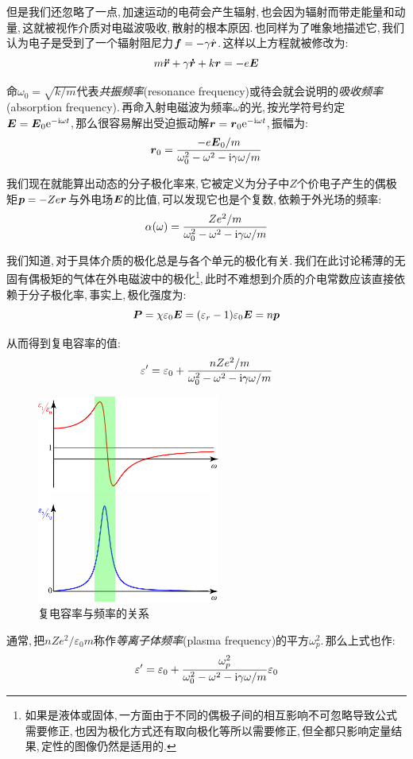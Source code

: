 但是我们还忽略了一点,\,加速运动的电荷会产生辐射,\,也会因为辐射而带走能量和动量,\,这就被视作介质对电磁波吸收,\,散射的根本原因.\,也同样为了唯象地描述它,\,我们认为电子是受到了一个辐射阻尼力$\boldsymbol{f}=-\gamma \dot{\boldsymbol{r}}$.\,这样以上方程就被修改为:
\[m\boldsymbol{\ddot{r}}+\gamma \boldsymbol{\dot{r}}+k\boldsymbol{r}=-e\boldsymbol{E}\]

命$\omega_0=\sqrt{k/m}$代表\emph{共振频率}(resonance frequency)或待会就会说明的\emph{吸收频率}(absorption frequency).\,再命入射电磁波为频率$\omega$的光,\,按光学符号约定$\boldsymbol{E}=\boldsymbol{E}_0{\rm e}^{-{\rm i}\omega t}$,\,那么很容易解出受迫振动解$\boldsymbol{r}=\boldsymbol{r}_0{\rm e}^{-{\rm i}\omega t}$,\,振幅为:
\[\boldsymbol{r}_0=\frac{-e\boldsymbol{E}_0/m}{\omega_0^2-\omega^2-{\rm i}\gamma\omega/m}\]

我们现在就能算出动态的分子极化率来,\,它被定义为分子中$Z$个价电子产生的偶极矩$\boldsymbol{p}=-Ze\boldsymbol{r}$与外电场$\boldsymbol{E}$的比值,\,可以发现它也是个复数,\,依赖于外光场的频率:
\[\alpha(\omega)=\frac{Ze^2/m}{\omega_0^2-\omega^2-{\rm i}\gamma\omega/m}\]

我们知道,\,对于具体介质的极化总是与各个单元的极化有关.\,我们在此讨论稀薄的无固有偶极矩的气体在外电磁波中的极化\footnote{如果是液体或固体,\,一方面由于不同的偶极子间的相互影响不可忽略导致公式需要修正,\,也因为极化方式还有取向极化等所以需要修正,\,但全都只影响定量结果,\,定性的图像仍然是适用的.},\,此时不难想到介质的介电常数应该直接依赖于分子极化率,\,事实上,\,极化强度为:
\[\boldsymbol{P}=\chi\varepsilon_0\boldsymbol{E}=(\varepsilon_r-1)\varepsilon_0\boldsymbol{E}=n\boldsymbol{p}\]


从而得到复电容率的值:
\[\varepsilon'=\varepsilon_0+\frac{nZe^2/m}{\omega_0^2-\omega^2-{\rm i}\gamma\omega/m}\]

\begin{figure}
\centering
\vspace{-15pt}
\includegraphics[width=6cm]{image/18-1-1.png}
\caption{复电容率与频率的关系}
\end{figure}
通常,\,把$nZe^2/\varepsilon_0 m$称作\emph{等离子体频率}(plasma frequency)的平方$\omega_p^2$.\,那么上式也作:
\[\varepsilon'=\varepsilon_0+\frac{\omega_p^2}{\omega_0^2-\omega^2-{\rm i}\gamma\omega/m}\varepsilon_0\]

